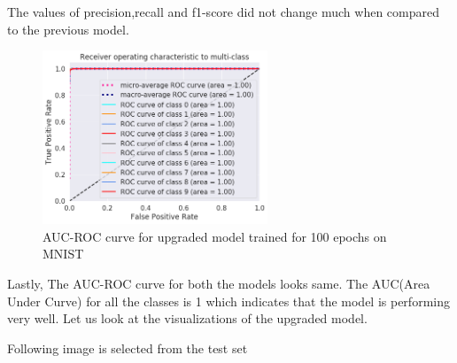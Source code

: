  \newpage\noindent The values of precision,recall and f1-score did not change much when compared to the previous model.\\   


\begin{figure}[h]
    \centering
    \includegraphics[width=0.6\textwidth]{thesis_template/images/roc.png}
    \caption{\small AUC-ROC curve for upgraded model trained for 100 epochs on MNIST}
    \label{}
    \end{figure}


\noindent Lastly, The AUC-ROC curve for both the models looks same. The AUC(Area Under Curve) for all the classes is 1 which indicates that the model is performing very well. Let us look at the visualizations of the upgraded model. 

\newpage\noindent Following image is selected from the test set

